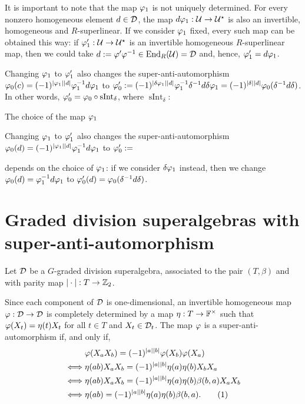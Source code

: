 \documentclass{amsbook}
\newcommand\numberthis{\addtocounter{equation}{1}\tag{\theequation}}
\begin{document}
It is important to note that the map $\varphi_1$ is not uniquely determined. For every nonzero homogeneous element $d\in\mathcal{D}$, the map $d\varphi_1: \mathcal U \to \mathcal U^\star$ is also an invertible, homogeneous and $R$-superlinear. If we consider $\varphi_1$ fixed, every such map can be obtained this way: if $\varphi_1' : \mathcal U \to \mathcal U^\star$ is an invertible homogeneous $R$-superlinear map, then we could take $d := \varphi'\varphi^{-1} \in \operatorname{End}_R(\mathcal U) = \mathcal{D}$ and, hence, $\varphi_1' = d \varphi_1$.

Changing $\varphi_1$ to $\varphi_1'$ also changes the super-anti-automorphism $\varphi_0 (c) = (-1)^{|\varphi_1||d|}\varphi_1^{-1} d \varphi_1$ to $\varphi_0':= (-1)^{|\delta\varphi_1||d|}\varphi_1^{-1}\delta^{-1} d \delta\varphi_1= (-1)^{|\delta||d|} \varphi_0(\delta^{-1} d \delta)$. In other words, $\varphi_0' = \varphi_0 \circ \operatorname{sInt}_\delta$, where $\operatorname{sInt}_\delta: $

The choice of the map $\varphi_1$ 

Changing $\varphi_1$ to $\varphi_1'$ also changes the super-anti-automorphism $\varphi_0(d) = (-1)^{|\varphi_1||d|}\varphi_1^{-1} d \varphi_1$ to $\varphi_0':= $


depends on the choice of $\varphi_1$: if we consider $\delta\varphi_1$ instead, then we change $\varphi_0(d) = \varphi_1^{-1} d \varphi_1$ to $\varphi_0'(d) = \varphi_0(\delta^{-1} d \delta)$.

\section{Graded division superalgebras with super-anti-automorphism}


Let $\mathcal{D}$ be a $G$-graded division superalgebra, associated to the pair $(T, \beta)$ and with parity map $| \cdot |: T \to \mathbb{Z}_2$.

Since each component of $\mathcal{D}$ is one-dimensional, an invertible homogeneous map $\varphi: \mathcal{D} \to \mathcal{D}$ is completely determined by a map $\eta: T \to \mathbb{F}^\times$ such that $\varphi(X_t) = \eta(t) X_t$ for all $t\in T$ and $X_t\in \mathcal{D}_t$.
The map $\varphi$ is a super-anti-automorphism if, and only if,
%
\begin{align*}
    &\vphi(X_a X_b) = (-1)^{|a||b|} \vphi(X_b) \vphi(X_a)\\ \iff& \eta(ab)X_a X_b = (-1)^{|a||b|} \eta(a) \eta(b) X_b X_a\\ \iff& \eta(ab)X_a X_b = (-1)^{|a||b|} \eta(a) \eta(b) \beta(b,a) X_a X_b\\ \iff& \eta(ab) = (-1)^{|a||b|} \eta(a) \eta(b) \beta(b,a). \numberthis \label{eq:eta-super-anti-auto}
\end{align*}
\end{document}
